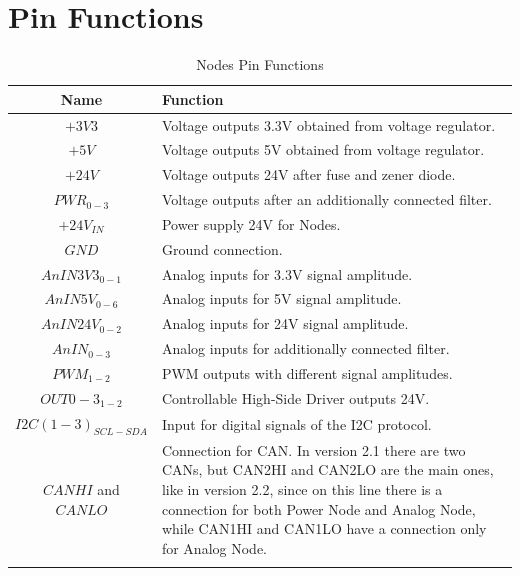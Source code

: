 \documentclass[10pt]{datasheet}
\begin{document}
\section{Pin Functions}
\begin{table}[h]
\begin{threeparttable}
\caption{Nodes Pin Functions}
\label{table:nodes_pins}
\begin{tabularx}{\textwidth}{ c | X }
    \thickhline
    \textbf{Name} & \textbf{Function} \\
    \hline
    $+3V3$ & Voltage outputs 3.3V obtained from voltage regulator.\tnote{1}  \\
    \hline
    $+5V$ & Voltage outputs 5V obtained from voltage regulator.\tnote{1} \\
    \hline
    $+24V$ & Voltage outputs 24V after fuse and zener diode.\tnote{1} \\
    \hline
    $PWR_{0-3}$ & Voltage outputs after an additionally connected filter.\tnote{2} \\
    \hline
    $+24V_{IN}$ & Power supply 24V for Nodes.\tnote{1}\\
    \hline
    $GND$ & Ground connection.\\
    \hline
    $AnIN3V3_{0-1}$ & Analog inputs for 3.3V signal amplitude.\tnote{2}\\
    \hline
    $AnIN5V_{0-6}$ & Analog inputs for 5V signal amplitude.\tnote{2} \\
    \hline
    $AnIN24V_{0-2}$ & Analog inputs for 24V signal amplitude.\tnote{2} \\
    \hline
    $AnIN_{0-3}$ & Analog inputs for additionally connected filter.\tnote{2}\\
    \hline
    $PWM_{1-2}$ & PWM outputs with different signal amplitudes.\tnote{3} \\
    \hline
    $OUT0-3_{1-2}$ & Controllable High-Side Driver outputs 24V.\tnote{4} \\
    \hline
    $I2C(1-3)_{SCL-SDA}$ & Input for digital signals of the I2C protocol.\tnote{5} \\
    \hline
    $CANHI$ and $CANLO$ & Connection for CAN. In version 2.1 there are two CANs, but CAN2HI and CAN2LO are the main ones, like in version 2.2, since on this line there is a connection for both Power Node and Analog Node, while CAN1HI and CAN1LO have a connection only for Analog Node.\tnote{6} \\
    \hline
    \thickhline
\end{tabularx}
\begin{tablenotes}

\end{tablenotes}
\end{threeparttable}
\end{table}
\end{document}

